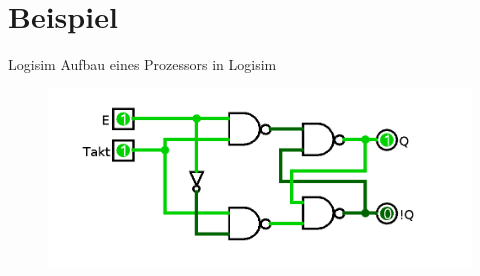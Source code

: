 \documentclass{beamer}
\begin{document}
\section{Beispiel}
\begin{frame}{Logisim}
Aufbau eines Prozessors in Logisim
\begin{figure}[!htb]
\centering
\includegraphics[scale=0.30]{flipflop}
\end{figure}
\end{frame}
\end{document}
